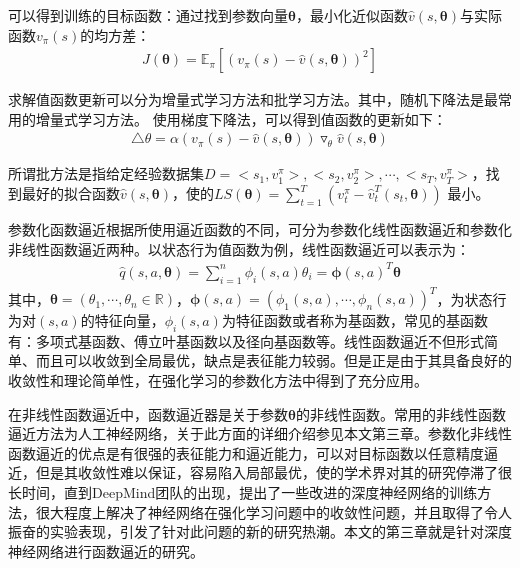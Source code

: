 可以得到训练的目标函数：通过找到参数向量$\mathbf{\theta}$，最小化近似函数$\hat{v}(s,\mathbf{\theta})$与实际函数$v_{\pi}(s)$的均方差：
\begin{equation}
\begin{aligned}
J(\mathbf{\theta})=\mathbb{E}_{\pi}[(v_{\pi}(s)-\hat{v}(s,\mathbf{\theta}))^2]
\end{aligned}
\end{equation}

求解值函数更新可以分为增量式学习方法和批学习方法。其中，随机下降法是最常用的增量式学习方法。
使用梯度下降法，可以得到值函数的更新如下：
\begin{equation}
\begin{aligned}
\triangle \theta = \alpha (v_{\pi}(s)-\hat{v}(s,\mathbf{\theta})) \triangledown_{\theta} \hat{v}(s,\mathbf{\theta})
\end{aligned}
\end{equation}

所谓批方法是指给定经验数据集$D={<s_{1},v^{\pi}_{1}>,<s_{2},v^{\pi}_{2}>,\cdots,<s_{T},v^{\pi}_{T}>}$，找到最好的拟合函数$\hat{v}(s,\mathbf{\theta})$，使的$LS(\mathbf{\theta})=\sum_{t=1}^{T}(v^{\pi}_{t}-\hat{v}^{T}_{t}(s_{t},\mathbf{\theta}))$ 最小。

参数化函数逼近根据所使用逼近函数的不同，可分为参数化线性函数逼近和参数化非线性函数逼近两种。以状态行为值函数为例，线性函数逼近可以表示为：
\begin{displaymath}
\begin{aligned}
\hat{q}(s,a,\mathbf{\theta})=\sum^{n}_{i=1}\phi_{i}(s,a)\theta_{i}=\mathbf{\phi }(s,a)^{T}\mathbf{\theta }
\end{aligned}
\end{displaymath}
其中，$\mathbf{\theta}=(\theta_{1},\cdots,\theta_{n}\in\mathbb{R})$，$\mathbf{\phi}(s,a)=(\phi_{1}(s,a),\cdots,\phi_{n}(s,a))^{T}$，为状态行为对$(s,a)$的特征向量，$\phi_{i}(s,a)$为特征函数或者称为基函数，常见的基函数有：多项式基函数、傅立叶基函数以及径向基函数等。线性函数逼近不但形式简单、而且可以收敛到全局最优，缺点是表征能力较弱。但是正是由于其具备良好的收敛性和理论简单性，在强化学习的参数化方法中得到了充分应用。

在非线性函数逼近中，函数逼近器是关于参数$\mathbf{\theta}$的非线性函数。常用的非线性函数逼近方法为人工神经网络，关于此方面的详细介绍参见本文第三章。参数化非线性函数逼近的优点是有很强的表征能力和逼近能力，可以对目标函数以任意精度逼近，但是其收敛性难以保证，容易陷入局部最优，使的学术界对其的研究停滞了很长时间，直到DeepMind团队的出现，提出了一些改进的深度神经网络的训练方法，很大程度上解决了神经网络在强化学习问题中的收敛性问题，并且取得了令人振奋的实验表现，引发了针对此问题的新的研究热潮。本文的第三章就是针对深度神经网络进行函数逼近的研究。

